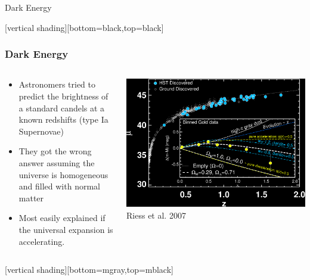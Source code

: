\documentclass{beamer}
\begin{document}
\frame
{

    {\Huge Dark Energy }

}

{
    [vertical shading][bottom=black,top=black]

    \frame
    {
        \frametitle{Dark Energy}

        \begin{columns}
            \begin{column}{0.4\textwidth}    
                \begin{itemize}

                    \item Astronomers tried to predict the brightness of a
                        standard candels at a known redshifts (type Ia
                        Supernovae)

                    \item They got the wrong answer assuming the universe is
                        homogeneous and filled with normal matter

                    \item Most easily explained if the universal expansion is accelerating.

                \end{itemize}
            \end{column}
            \begin{column}{0.6\textwidth}
                \begin{center}
                    \includegraphics[width=\textwidth]{riess-distmodulus.png}
                    \newline
                    {\tiny Riess et al. 2007}
                \end{center}
            \end{column}
        \end{columns}
    }

    [vertical shading][bottom=mgray,top=mblack]
}
\end{document}
